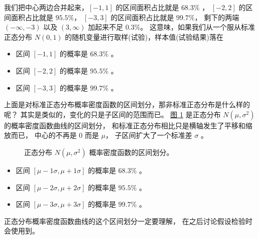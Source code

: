 \documentclass[letterpaper,10pt,english]{sphinxmanual}
\begin{document}
我们把中心两边合并起来，\([-1,1]\) 的区间面积占比就是 \(68.3\%\)
， \([-2,2]\) 的区间面积占比就是 \(95.5\%\)，
\([-3,3]\) 的区间面积占比就是 \(99.7\%\)，
剩下的两端 \((-\infty,-3)\) 以及 \((3,\infty)\)
加起来不足 \(0.3\%\)。
这意味，如果我们从一个服从标准正态分布 \(N(0,1)\)
的随机变量进行取样(试验)，样本值(试验结果)落在
\begin{itemize}
\item {} 
区间 \([-1,1]\) 的概率是 \(68.3\%\) 。

\item {} 
区间 \([-2,2]\) 的概率是 \(95.5\%\) 。

\item {} 
区间 \([-3,3]\) 的概率是 \(99.7\%\) 。

\end{itemize}

上面是对标准正态分布概率密度函数的区间划分，那非标准正态分布是什么样的呢？
其实是类似的，变化的只是子区间的范围而已。
\hyperref[\detokenize{_u6982_u7387_u57fa_u7840/content:fg-probability-009}]{图 \ref{\detokenize{_u6982_u7387_u57fa_u7840/content:fg-probability-009}}} 是正态分布 \(N(\mu,\sigma^2)\)
的概率密度函数曲线的区间划分，
和标准正态分布相比只是横轴发生了平移和缩放而已，
中心的不再是 \(0\)
而是 \(\mu\)，
子区间扩大了一个标准差 \(\sigma\) 。

\begin{figure}[htbp]
\centering
\capstart

\noindent{}
\caption{正态分布 \(N(\mu,\sigma^2)\) 概率密度函数的区间划分。}\label{\detokenize{_u6982_u7387_u57fa_u7840/content:id30}}\label{\detokenize{_u6982_u7387_u57fa_u7840/content:fg-probability-009}}\end{figure}
\begin{itemize}
\item {} 
区间 \([\mu-1\sigma,\mu+1\sigma]\) 的概率是 \(68.3\%\) 。

\item {} 
区间 \([\mu-2\sigma,\mu+2\sigma]\) 的概率是 \(95.5\%\) 。

\item {} 
区间 \([\mu-3\sigma,\mu+3\sigma]\) 的概率是 \(99.7\%\) 。

\end{itemize}

正态分布概率密度函数曲线的这个区间划分一定要理解，
在之后讨论假设检验时会使用到。
\end{document}
